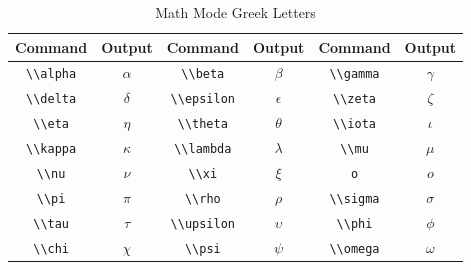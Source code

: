	
	
	\begin{table}[ht]
		\centering
		\caption{Math Mode Greek Letters}
		\label{tab:greek_letters}
		\begin{tabularx}{\linewidth}{CCCCCC}
		\toprule
				\textbf{Command} & \textbf{Output} & \textbf{Command} & \textbf{Output} & \textbf{Command} & \textbf{Output} \\
			\midrule
				\lstinline|\\alpha| & \(\alpha\) & \lstinline|\\beta| & \(\beta\) & \lstinline|\\gamma| & \(\gamma\) \\
				\lstinline|\\delta| & \(\delta\) & \lstinline|\\epsilon| & \(\epsilon\) & \lstinline|\\zeta| & \(\zeta\) \\
				\lstinline|\\eta| & \(\eta\) & \lstinline|\\theta| & \(\theta\) & \lstinline|\\iota| & \(\iota\) \\
				\lstinline|\\kappa| & \(\kappa\) & \lstinline|\\lambda| & \(\lambda\) & \lstinline|\\mu| & \(\mu\) \\
				\lstinline|\\nu| & \(\nu\) & \lstinline|\\xi| & \(\xi\) & \lstinline|o| & \(o\) \\
				\lstinline|\\pi| & \(\pi\) & \lstinline|\\rho| & \(\rho\) & \lstinline|\\sigma| & \(\sigma\) \\
				\lstinline|\\tau| & \(\tau\) & \lstinline|\\upsilon| & \(\upsilon\) & \lstinline|\\phi| & \(\phi\) \\
				\lstinline|\\chi| & \(\chi\) & \lstinline|\\psi| & \(\psi\) & \lstinline|\\omega| & \(\omega\) \\

\end{tabularx}
\end{table}
